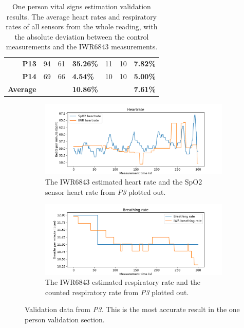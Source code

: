 \begin{table}[ht]
\begin{tabular}{|r|c|c|l|c|c|l|}
\textbf{P13} & 94 & 61 & \textbf{35.26\%} & 11 & 10 & \textbf{7.82\%} \\
\textbf{P14} & 69 & 66 & \textbf{4.54\%} & 10 & 10 & \textbf{5.00\%} \\ \hline
\textbf{Average} & \textbf{} & \textbf{} & \textbf{10.86\%} &  &  & \textbf{7.61\%} \\ \hline
\end{tabular}
\caption{One person vital signs estimation validation results. The average heart rates and respiratory rates of all sensors from the whole reading, with the absolute deviation between the control measurements and the IWR6843 measurements.}
\label{tab:one-person-results_2}
\end{table}

\begin{figure}[t]
\begin{subfigure}{\textwidth}
  \centering
  \includegraphics[width=\linewidth]{figures/validation/roy_heart.pdf}  
  \caption{The IWR6843 estimated heart rate and the SpO2 sensor heart rate from \emph{P3} plotted out.}
  \label{fig:roy_heart}
\end{subfigure}
\begin{subfigure}{\textwidth}
  \centering
  \includegraphics[width=\linewidth]{figures/validation/roy_breath.pdf}  
  \caption{The IWR6843 estimated respiratory rate and the counted respiratory rate from \emph{P3} plotted out.}
  \label{fig:roy_breath}
\end{subfigure}
\caption{Validation data from \emph{P3}. This is the most accurate result in the one person validation section.}
\label{fig:roy_meas}
\end{figure}

